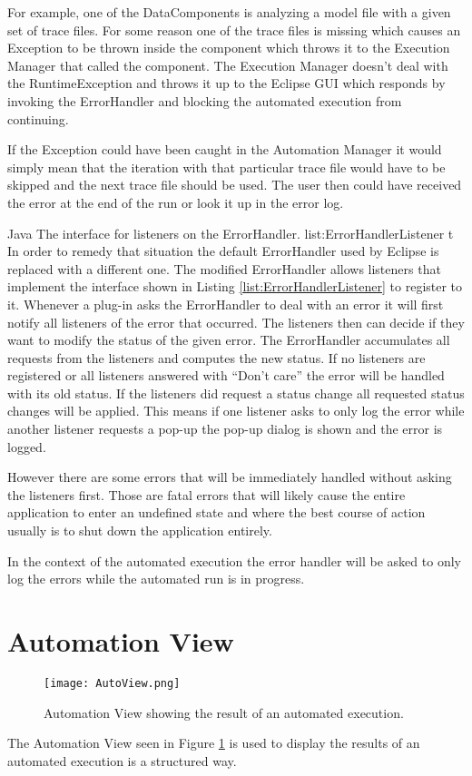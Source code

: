 For example, one of the DataComponents is analyzing a model file with a given set of trace files.
For some reason one of the trace files is missing which causes an Exception to be thrown inside
the component which throws it to the Execution Manager that called the component. The Execution
Manager doesn't deal with the RuntimeException and throws it up to the Eclipse \ac{GUI} which
responds by invoking the ErrorHandler and blocking the automated execution from continuing. 

If the Exception could have been caught in the Automation Manager it would simply mean that
the iteration with that particular trace file would have to be skipped and the next trace file
should be used. The user then could have received the error at the end of the run or look it up
in the error log.

\listingjava
{}
{Java}
{The interface for listeners on the ErrorHandler.}
{list:ErrorHandlerListener}
{t}
In order to remedy that situation the default ErrorHandler used by Eclipse is replaced with 
a different one. The modified ErrorHandler allows listeners that implement the interface
shown in Listing \ref{list:ErrorHandlerListener} to register to it. Whenever
a plug-in asks the ErrorHandler to deal with an error it will first notify all listeners
of the error that occurred. The listeners then can decide if they want to modify
the status of the given error. The ErrorHandler accumulates all requests from the listeners
and computes the new status. If no listeners are registered or all listeners answered
with ``Don't care'' the error will be handled with its old status. If the listeners
did request a status change all requested status changes will be applied. This
means if one listener asks to only log the error while another listener requests a pop-up
the pop-up dialog is shown and the error is logged.

However there are some errors that will be immediately handled without asking the
listeners first. Those are fatal errors that will likely cause the entire application
to enter an undefined state and where the best course of action usually is to shut down
the application entirely.

In the context of the automated execution the error handler will be asked to only log
the errors while the automated run is in progress.

\section{Automation View}
\label{section:AutoView}
\begin{figure}
  \centering
  \texttt{[image: AutoView.png]}
  \caption[Automation View showing the result of an automated execution.]%
  {Automation View showing the result of an automated execution.\protect}
  \label{fig:AutoView}
\end{figure}
The Automation View seen in Figure \ref{fig:AutoView} is used to display the results of an automated execution is a structured
way.

